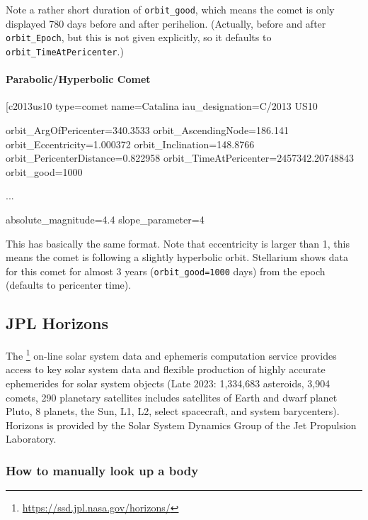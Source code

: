 Note a rather short duration of
\texttt{orbit\_good}, which means the comet is only displayed 780 days
before and after perihelion. (Actually, before and after
\texttt{orbit\_Epoch}, but this is not given explicitly, so it
defaults to \texttt{orbit\_TimeAtPericenter}.)


\paragraph{Parabolic/Hyperbolic Comet}
\label{sec:ssystem.ini:Comet:Parabolic}

\begin{configfile}
[c2013us10%
type=comet
name=Catalina
iau_designation=C/2013 US10

orbit_ArgOfPericenter=340.3533
orbit_AscendingNode=186.141
orbit_Eccentricity=1.000372
orbit_Inclination=148.8766
orbit_PericenterDistance=0.822958
orbit_TimeAtPericenter=2457342.20748843
orbit_good=1000

...

absolute_magnitude=4.4
slope_parameter=4
\end{configfile}

This has basically the same format. Note that eccentricity is larger than 1,
this means the comet is following a slightly hyperbolic
orbit. Stellarium shows data for this comet for almost 3 years
(\texttt{orbit\_good=1000} days) from the epoch (defaults to pericenter time).


\subsection{JPL Horizons}
\label{sec:ssystem.ini:JPLHorizons}


The \footnote{\url{https://ssd.jpl.nasa.gov/horizons/}} on-line solar system data and ephemeris computation service provides access to key solar system data and 
flexible production of highly accurate ephemerides for solar system objects (Late 2023: 1,334,683 asteroids, 3,904 comets, 290 planetary satellites {includes satellites of Earth and dwarf planet Pluto}, 
8 planets, the Sun, L1, L2, select spacecraft, and system barycenters). Horizons is provided by the Solar System Dynamics Group of the Jet Propulsion Laboratory.

\subsubsection{How to manually look up a body}

